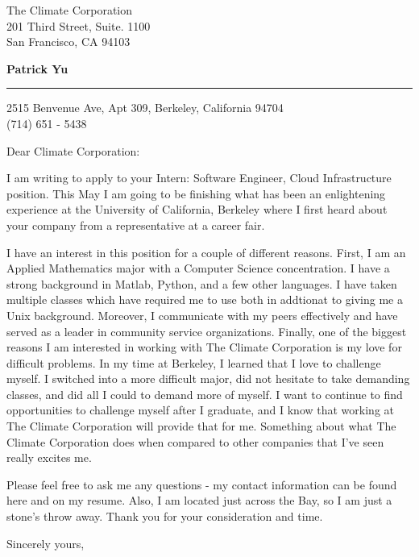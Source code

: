 \documentclass{letter} %
\begin{document}
\signature{Patrick Yu}           %
\longindentation=0pt                       %
\let\raggedleft\raggedright                %
 
 
\begin{letter}{
The Climate Corporation\\
201 Third Street, Suite. 1100\\
San Francisco, CA 94103}

\begin{flushleft}
{\large\bf Patrick Yu}
\end{flushleft}
\medskip\hrule height 1pt
\begin{flushright}
\hfill 2515 Benvenue Ave, Apt 309, Berkeley, California 94704 \\
\hfill (714) 651 - 5438
\end{flushright} 
\vfill %

 
\opening{Dear Climate Corporation:} 
 
\noindent I am writing to apply to your Intern: Software Engineer, Cloud Infrastructure position. This May I am going to be finishing what has been an enlightening experience at the University of California, Berkeley where I first heard about your company from a representative at a career fair.

\noindent I have an interest in this position for a couple of different reasons. First, I am an Applied Mathematics major with a Computer Science concentration. I have a strong background in Matlab, Python, and a few other languages. I have taken multiple classes which have required me to use both in addtionat to giving me  a Unix background. Moreover, I communicate with my peers effectively and have served as a leader in community service organizations. Finally, one of the biggest reasons I am interested in working with The Climate Corporation is my love for difficult problems. In my time at Berkeley, I learned that I love to challenge myself. I switched into a more difficult major, did not hesitate to take demanding classes, and did all I could to demand more of myself. I want to continue to find opportunities to challenge myself after I graduate, and I know that working at The Climate Corporation will provide that for me.  Something about what The Climate Corporation does when compared to other companies that I've seen really excites me.

\noindent Please feel free to ask me any questions - my contact information can be found here and on my resume. Also, I am located just across the Bay, so I am just a stone's throw away. Thank you for your consideration and time.
 
\closing{Sincerely yours,} 
 

 

\end{letter}
 
\end{document}

